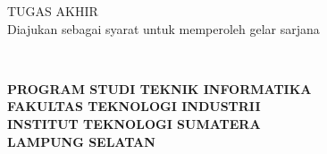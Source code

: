 \clearpage
\pagestyle{empty}
% 

\begin{center}
\smallskip

    \begin{figure}[h]
    	\centering
    \end{figure}

	\large \bfseries \MakeUppercase{\thetitle}
	\vfill

    \large \uppercase{Tugas Akhir}\\
    {\normalsize \normalfont Diajukan sebagai syarat untuk memperoleh gelar sarjana}
    \vfill

    \normalsize \normalfont \theauthor\\
    \printnim
    \vfill

    \normalsize \bfseries
    \uppercase{
        Program Studi Teknik Informatika \\
        Fakultas Teknologi Industrii\\
        Institut Teknologi Sumatera\\
        Lampung Selatan
    }\medskip

    \the\year{}

\end{center}

\clearpage
